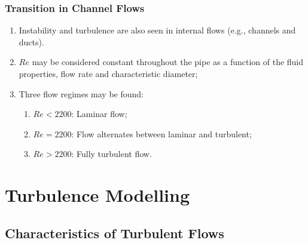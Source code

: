 \documentclass[10pt,compress]{beamer}
\begin{document}
\begin{frame}
 \frametitle{Transition in Channel Flows}
     \begin{enumerate}%
        \item<1-> Instability and turbulence are also seen in internal flows (e.g., channels and ducts).
        \item<1-> $Re$ may be considered constant throughout the pipe as a function of the fluid properties, flow rate and characteristic diameter;
        \item<2-> Three flow regimes may be found:
            \begin{enumerate}
                \item<2-> $Re < 2200$: Laminar flow;
                \item<2-> $Re = 2200$: Flow alternates between laminar and turbulent;
                \item<2-> $Re > 2200$: Fully turbulent flow.
            \end{enumerate}
       \end{enumerate}

\end{frame}

\section{Turbulence Modelling}

\subsection{Characteristics of Turbulent Flows}
\end{document}
